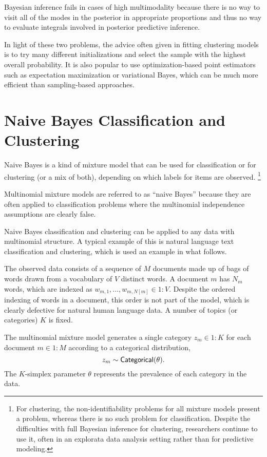 Bayesian inference fails in cases of high multimodality because there
is no way to visit all of the modes in the posterior in appropriate
proportions and thus no way to evaluate integrals involved in
posterior predictive inference.

In light of these two problems, the advice often given in fitting
clustering models is to try many different initializations and select
the sample with the highest overall probability.  It is also popular
to use optimization-based point estimators such as expectation
maximization or variational Bayes, which can be much more efficient
than sampling-based approaches.


\section{Naive Bayes Classification and Clustering}

Naive Bayes is a kind of mixture model that can be used for
classification or for clustering (or a mix of both), depending on
which labels for items are observed.%
%
\footnote{For clustering, the non-identifiability problems for all
  mixture models present a problem, whereas there is no such problem
  for classification.  Despite the difficulties with full Bayesian
  inference for clustering, researchers continue to use it, often in
  an explorata data analysis setting rather than for predictive
  modeling.}

Multinomial mixture models are referred to as ``naive Bayes'' because
they are often applied to classification problems where the
multinomial independence assumptions are clearly false. 

Naive Bayes classification and clustering can be applied to any data
with multinomial structure.  A typical example of this is natural
language text classification and clustering, which is used an example
in what follows. 

The observed data consists of a sequence of $M$ documents made up of
bags of words drawn from a vocabulary of $V$ distinct words.  A
document $m$ has $N_m$ words, which are indexed as $w_{m,1}, \ldots,
w_{m,N[m]} \in 1{:}V$.  Despite the ordered indexing of words in a
document, this order is not part of the model, which is clearly
defective for natural human language data.  A number of topics (or
categories) $K$ is fixed.

The multinomial mixture model generates a single category $z_m \in
1{:}K$ for each document $m \in 1{:}M$ according to a categorical
distribution,
\[
z_m \sim \mbox{\sf Categorical}(\theta).
\]
The $K$-simplex parameter $\theta$ represents the prevalence of each
category in the data.  

